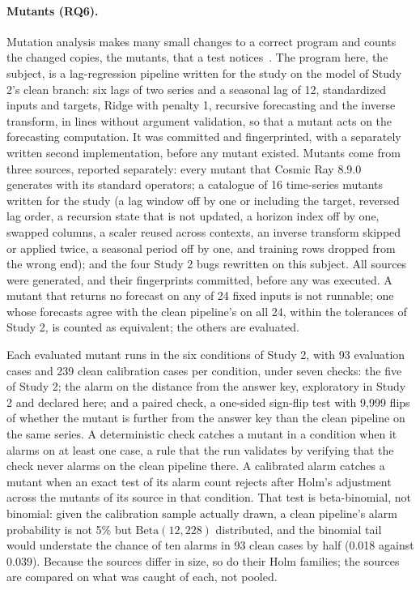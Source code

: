 \documentclass[11pt,a4paper]{article}
\begin{document}
\paragraph{Mutants (RQ6).}
Mutation analysis makes many small changes to a correct program and
counts the changed copies, the mutants, that a test
notices~\cite{jia2011analysis}. The program here, the subject, is a
lag-regression pipeline written for the study on the model of Study 2's
clean branch: six lags of two series and a seasonal lag of 12,
standardized inputs and targets, Ridge with penalty 1, recursive
forecasting and the inverse transform, in \ThirdSubjectLines{} lines
without argument validation, so that a mutant acts on the forecasting
computation. It was committed and fingerprinted, with a separately written
second implementation, before any mutant existed. Mutants come from three
sources, reported separately: every mutant that Cosmic Ray
8.9.0~\cite{cosmicray2026} generates with its standard operators; a
catalogue of 16 time-series mutants written for the study (a lag window
off by one or including the target, reversed lag order, a recursion state
that is not updated, a horizon index off by one, swapped columns, a scaler
reused across contexts, an inverse transform skipped or applied twice, a
seasonal period off by one, and training rows dropped from the wrong end);
and the four Study 2 bugs rewritten on this subject. All sources were
generated, and their fingerprints committed, before any was executed. A
mutant that returns no forecast on any of 24 fixed inputs is not runnable;
one whose forecasts agree with the clean pipeline's on all 24, within the
tolerances of Study 2, is counted as equivalent; the others are evaluated.

Each evaluated mutant runs in the six conditions of Study 2, with 93
evaluation cases and 239 clean calibration cases per condition, under
seven checks: the five of Study 2; the alarm on the distance from the
answer key, exploratory in Study 2 and declared here; and a paired check,
a one-sided sign-flip test with 9,999 flips of whether the mutant is
further from the answer key than the clean pipeline on the same series. A
deterministic check catches a mutant in a condition when it alarms on at
least one case, a rule that the run validates by verifying that the check
never alarms on the clean pipeline there. A calibrated alarm catches a
mutant when an exact test of its alarm count rejects after Holm's
adjustment across the mutants of its source in that condition. That test
is beta-binomial, not binomial: given the calibration sample actually
drawn, a clean pipeline's alarm probability is not 5\% but
$\mathrm{Beta}(12,228)$ distributed, and the binomial tail would
understate the chance of ten alarms in 93 clean cases by half (0.018
against 0.039). Because the sources differ in size, so do their Holm
families; the sources are compared on what was caught of each, not pooled.
\end{document}
